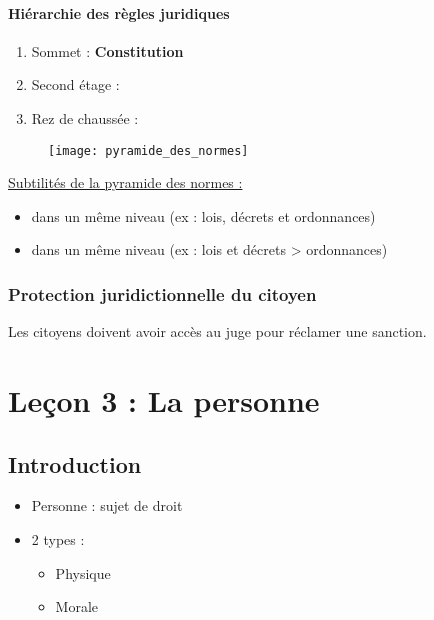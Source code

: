 \subsubsection{Hiérarchie des règles juridiques}

\begin{enumerate}
\item Sommet : \textbf{Constitution}
\item Second étage : 
\item Rez de chaussée : 
\end{enumerate}

\begin{figure}[H]
    \texttt{[image: pyramide\_des\_normes]}
    \centering
\end{figure}

\underline{Subtilités de la pyramide des normes :}
\begin{itemize}
\item {} dans un même niveau (ex : lois, décrets et ordonnances)
\item {} dans un même niveau (ex : lois et décrets > ordonnances)
\end{itemize}

\subsection{Protection juridictionnelle du citoyen}
Les citoyens doivent avoir accès au juge pour réclamer une sanction.

\newpage
\chapter{Leçon 3 : La personne}

\section{Introduction}

\begin{itemize}
    \item Personne : sujet de droit
    \item 2 types :
    \begin{itemize}
        \item Physique
        \item Morale
    \end{itemize}
\end{itemize}

